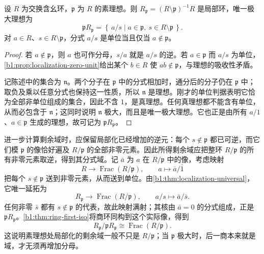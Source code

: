 \begin{proposition}\label{b1:prop:localization-at-prime}
	设 \(R\) 为交换含幺环，\(\mathfrak p\) 为 \(R\) 的素理想。则 \(R_{\mathfrak p}=(R\setminus\mathfrak p)^{-1}R\) 是局部环，唯一极大理想为
	\[
		\mathfrak pR_{\mathfrak p} =\left\{\,a/s\mid a\in\mathfrak p,\ s\in R\setminus\mathfrak p\,\right\}.
	\]
	对 \(a\in R\)、\(s\in R\setminus\mathfrak p\)，分式 \(a/s\) 是单位当且仅当 \(a\notin\mathfrak p\)。
\end{proposition}
\begin{proof}
	若 \(a\notin\mathfrak p\)，则 \(a\) 也可作分母，\(s/a\) 就是 \(a/s\) 的逆。若 \(a\in\mathfrak p\) 而 \(a/s\) 为单位，\cref{b1:prop:localization-zero-unit}给出某个 \(b\in R\) 使 \(ab\notin\mathfrak p\)，与理想的吸收性矛盾。

	记陈述中的集合为 \(\mathfrak n\)。两个分子在 \(\mathfrak p\) 中的分式相加时，通分后的分子仍在 \(\mathfrak p\) 中；取负及乘以任意分式也保持这一性质，所以 \(\mathfrak n\) 是理想。刚才的单位判据表明它恰为全部非单位组成的集合，因此不含 \(1\)，是真理想。任何真理想都不能含有单位，从而必包含于 \(\mathfrak n\)；这同时说明 \(\mathfrak n\) 极大，而且是唯一极大理想。它也正是由所有 \(a/1\)、\(a\in\mathfrak p\) 生成的理想，故可记为 \(\mathfrak pR_{\mathfrak p}\)。
\end{proof}

进一步计算剩余域时，应保留局部化已经增加的逆元：每个 \(s\notin\mathfrak p\) 都已可逆，而它们模 \(\mathfrak p\) 的像恰好遍及 \(R/\mathfrak p\) 的全部非零元素。因此所得剩余域应把整环 \(R/\mathfrak p\) 的所有非零元素取逆，得到其分式域。记 \(\bar a\) 为 \(a\) 在 \(R/\mathfrak p\) 中的像，考虑映射
\[
	R\longrightarrow\operatorname{Frac}(R/\mathfrak p),\qquad a\longmapsto\bar a/\bar1
\]
把每个 \(s\notin\mathfrak p\) 送到非零元素，从而送到单位。由\cref{b1:thm:localization-universal}，它唯一延拓为
\[
	R_{\mathfrak p}\longrightarrow\operatorname{Frac}(R/\mathfrak p), \qquad a/s\longmapsto\bar a/\bar s.
\]
任何非零 \(\bar s\) 都有 \(s\notin\mathfrak p\) 的代表，故此映射满射；其核由 \(\bar a=0\) 的分式组成，正是 \(\mathfrak pR_{\mathfrak p}\)。\cref{b1:thm:ring-first-iso}将商环同构到这个实际像，得到
\begin{equation}\label{b1:eq:local-residue-field}
	R_{\mathfrak p}/\mathfrak pR_{\mathfrak p} \cong\operatorname{Frac}(R/\mathfrak p).
\end{equation}
这说明素理想处局部化的剩余域一般不只是 \(R/\mathfrak p\)；当 \(\mathfrak p\) 极大时，后一商本来就是域，才无须再增加分母。

